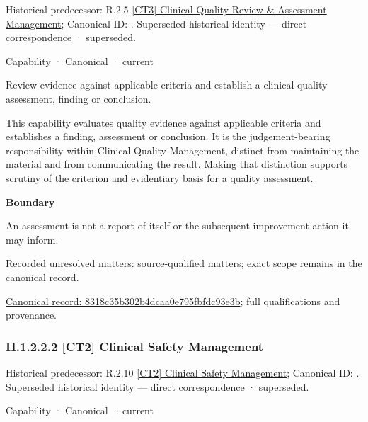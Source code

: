 {\small Historical predecessor: R.2.5 \hyperref[element:4b17ec92f0af4c4b9556912dbdd0f29f]{[CT3] Clinical Quality Review \& Assessment Management}; Canonical ID: \texttt{}. Superseded historical identity — direct correspondence · superseded.}\par
\label{element:8318c35b302b4dcaa0e795fbfdc93e3b}
{\small Capability · Canonical · current}\par

Review evidence against applicable criteria and establish a clinical-quality assessment, finding or conclusion.



This capability evaluates quality evidence against applicable criteria and establishes a finding, assessment or conclusion. It is the judgement-bearing responsibility within Clinical Quality Management, distinct from maintaining the material and from communicating the result. Making that distinction supports scrutiny of the criterion and evidentiary basis for a quality assessment.



\textbf{Boundary}



An assessment is not a report of itself or the subsequent improvement action it may inform.


{\small Recorded unresolved matters: source-qualified matters; exact scope remains in the canonical record.}\par
{\footnotesize \href{../../../../continuum/strategy/capability/8318c35b302b4dcaa0e795fbfdc93e3b.md}{Canonical record: 8318c35b302b4dcaa0e795fbfdc93e3b}; full qualifications and provenance.}\par
\subsubsection*{II.1.2.2.2 [CT2] Clinical Safety Management}
\label{navigation:II.1.2.2.2}

{\small Historical predecessor: R.2.10 \hyperref[element:650ccec030fa46cc8c9d6b508a841778]{[CT2] Clinical Safety Management}; Canonical ID: \texttt{}. Superseded historical identity — direct correspondence · superseded.}\par
\label{element:28d1bf3e514e4c29837ebedaf9e4917b}
{\small Capability · Canonical · current}\par

